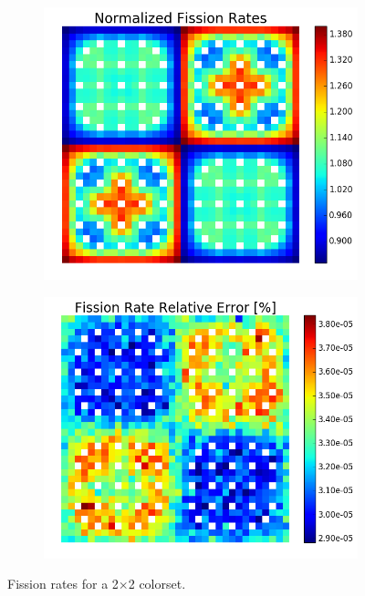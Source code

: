 \begin{figure}[h!]
\centering
\begin{subfigure}{0.5\textwidth}
  \centering
  \includegraphics[width=\linewidth]{figures/benchmarks/fission-rates/fiss-mean-2x2}
  \caption{}
  \label{fig:chap7-fiss-rate-mean-2x2}
\end{subfigure}%
\begin{subfigure}{0.5\textwidth}
  \centering
  \includegraphics[width=\linewidth]{figures/benchmarks/fission-rates/fiss-rel-err-2x2}
  \caption{}
  \label{fig:chap7-fiss-rate-rel-err-2x2}
\end{subfigure}%
\caption[Fission rates for a 2$\times$2 colorset]{Fission rates for a 2$\times$2 colorset.}
\label{fig:chap7-fiss-rates-2x2}
\end{figure}

